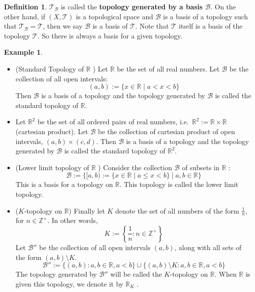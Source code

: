 \documentclass[
]{book}
\theoremstyle{definition}
\newtheorem{definition}{Definition}[chapter]
\theoremstyle{definition}
\newtheorem{example}{Example}[chapter]
\theoremstyle{definition}
\theoremstyle{definition}
\theoremstyle{remark}
\begin{document}
\begin{definition}
\protect\hypertarget{def:unnamed-chunk-11}{}\label{def:unnamed-chunk-11}\(\mathcal{T}_{\mathcal{B}}\) is called the \textbf{topology generated by a basis \(\mathcal{B}\)}. On the other hand, if \((X, \mathcal{T})\) is a topological space and \(\mathcal{B}\) is a basis of a topology such that \(\mathcal{T}_{\mathcal{B}}=\mathcal{T}\), then we say \(\mathcal{B}\) is a basis of \(\mathcal{T}\). Note that \(\mathcal{T}\) itself is a basis of the topology \(\mathcal{T}\). So there is always a basis for a given topology.
\end{definition}

\begin{example}
\protect\hypertarget{exm:unnamed-chunk-12}{}\label{exm:unnamed-chunk-12}\leavevmode

\begin{itemize}
\item
  (Standard Topology of \(\mathbb{R}\) ) Let \(\mathbb{R}\) be the set of all real numbers. Let \(\mathcal{B}\) be the collection of all open intervals:
  \[
  (a, b):=\{x \in \mathbb{R} \mid a<x<b\}
  \]
  Then \(\mathcal{B}\) is a basis of a topology and the topology generated by \(\mathcal{B}\) is called the standard topology of \(\mathbb{R}\).
\item
  Let \(\mathbb{R}^{2}\) be the set of all ordered pairs of real numbers, i.e.~\(\mathbb{R}^{2}:=\mathbb{R} \times \mathbb{R}\) (cartesian product). Let \(\mathcal{B}\) be the collection of cartesian product of open intervals, \((a, b) \times(c, d)\). Then \(\mathcal{B}\) is a basis of a topology and the topology generated by \(\mathcal{B}\) is called the standard topology of \(\mathbb{R}^{2}\).
\item
  (Lower limit topology of \(\mathbb{R}\) ) Consider the collection \(\mathcal{B}\) of subsets in \(\mathbb{R}\) :
  \[
  \mathcal{B}:=\{[a, b):=\{x \in \mathbb{R} \mid a \leq x<b\} \mid a, b \in \mathbb{R}\}
  \]
  This is a basis for a topology on \(\mathbb{R}\). This topology is called the lower limit topology.
\item
  (\(K\)-topology on \(\mathbb{R}\)) Finally let \(K\) denote the set of all numbers of the form \(\frac{1}{n}\), for \(n \in \mathbb{Z}^+\). In other words,
  \[K:=\left\{\frac{1}{n}:n\in \mathbb{Z}^+\right\}\]
  Let \(\mathcal{B}''\) be the collection of all open intervals \((a, b)\), along with all sets of the form \((a, b) \setminus K\).
  \[\mathcal{B}'':=\{(a, b):a,b\in\mathbb{R},a<b\}\cup \{(a, b) \setminus K:a,b\in\mathbb{R},a<b\}\]
  The topology generated
  by \(\mathcal{B}''\) will be called the \(K\)-topology on \(\mathbb{R}\). When \(\mathbb{R}\) is given this topology, we denote it by \(\mathbb{R}_K\) .
\end{itemize}

\end{example}
\end{document}
